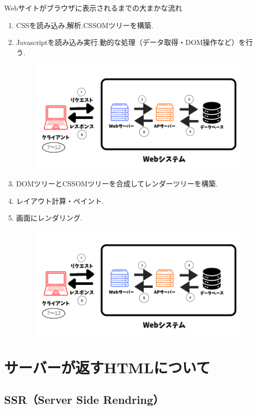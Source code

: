 \documentclass[aspectratio=169]{beamer}
\begin{document}
\begin{frame}[allowframebreaks]{Webサイトがブラウザに表示されるまでの大まかな流れ}
\begin{enumerate}
        \item CSSを読み込み,解析.CSSOMツリーを構築.
        
        \item Javascriptを読み込み実行.動的な処理（データ取得・DOM操作など）を行う.
        \begin{figure}
            \includegraphics[scale=0.25]{webfloat.png}
        \end{figure}
        \newpage
        \item DOMツリーとCSSOMツリーを合成してレンダーツリーを構築.
        \item レイアウト計算・ペイント.
        \item 画面にレンダリング.
        \begin{figure}
            \includegraphics[scale=0.25]{webfloat.png}
        \end{figure}
    \end{enumerate}
    
\end{frame}
\section{サーバーが返すHTMLについて}
\subsection{SSR（Server Side Rendring）}
\end{document}

